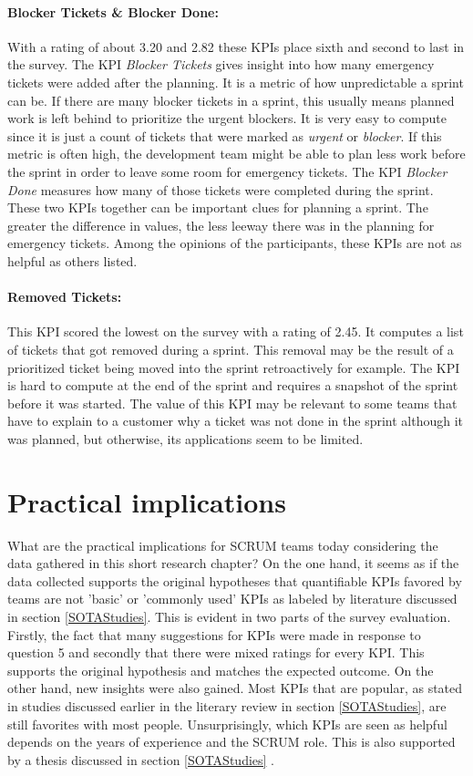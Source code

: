 \paragraph{\textbf{Blocker Tickets \& Blocker Done}:} With a rating of about 3.20 and 2.82 these KPIs place sixth and second to last in the survey. The KPI \textit{Blocker Tickets} gives insight into how many emergency tickets were added after the planning. It is a metric of how unpredictable a sprint can be. If there are many blocker tickets in a sprint, this usually means planned work is left behind to prioritize the urgent blockers. It is very easy to compute since it is just a count of tickets that were marked as \textit{urgent} or \textit{blocker}. If this metric is often high, the development team might be able to plan less work before the sprint in order to leave some room for emergency tickets. The KPI \textit{Blocker Done} measures how many of those tickets were completed during the sprint. These two KPIs together can be important clues for planning a sprint. The greater the difference in values, the less leeway there was in the planning for emergency tickets. Among the opinions of the participants, these KPIs are not as helpful as others listed. 

\paragraph{\textbf{Removed Tickets}:} This KPI scored the lowest on the survey with a rating of 2.45. It computes a list of tickets that got removed during a sprint. This removal may be the result of a prioritized ticket being moved into the sprint retroactively for example. The KPI is hard to compute at the end of the sprint and requires a snapshot of the sprint before it was started. The value of this KPI may be relevant to some teams that have to explain to a customer why a ticket was not done in the sprint although it was planned, but otherwise, its applications seem to be limited.

\section{Practical implications}

What are the practical implications for SCRUM teams today considering the data gathered in this short research chapter? 
On the one hand, it seems as if the data collected supports the original hypotheses that quantifiable KPIs 
favored by teams are not 'basic' or 'commonly used' KPIs as labeled by literature discussed in section \ref{SOTAStudies}.
This is evident in two parts of the survey evaluation. 
Firstly, the fact that many suggestions for KPIs were made in response to question 5 and secondly that there were mixed ratings
for every KPI. This supports the original hypothesis and matches the expected outcome.
On the other hand, new insights were also gained. 
Most KPIs that are popular, as stated in studies discussed earlier in the literary review in section \ref{SOTAStudies}, 
are still favorites with most people. 
Unsurprisingly, which KPIs are seen as helpful depends on the years of experience and the SCRUM role. This is also supported by
a thesis discussed in section \ref{SOTAStudies} \parencite{AgileProjectHealthIndicatorsThesis}.

